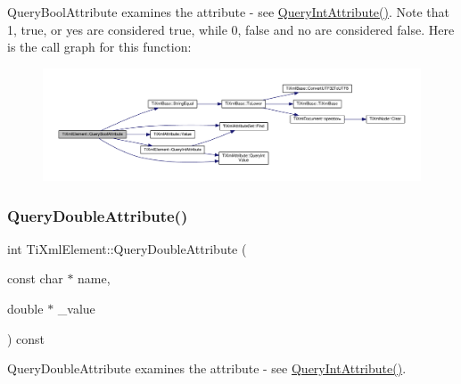 Query\+Bool\+Attribute examines the attribute -\/ see \hyperlink{class_ti_xml_element_a5c0f739e0f6f5905a201364532e54a60}{Query\+Int\+Attribute()}. Note that \textquotesingle{}1\textquotesingle{}, \textquotesingle{}true\textquotesingle{}, or \textquotesingle{}yes\textquotesingle{} are considered true, while \textquotesingle{}0\textquotesingle{}, \textquotesingle{}false\textquotesingle{} and \textquotesingle{}no\textquotesingle{} are considered false. Here is the call graph for this function\+:
\nopagebreak
\begin{figure}[H]
\begin{center}
\leavevmode
\includegraphics[width=350pt]{class_ti_xml_element_a5789b1488af75b6ae37a749700495ceb_cgraph}
\end{center}
\end{figure}
\mbox{\label{class_ti_xml_element_ae04bad29ddb281a7e6c662b3882e9928}} 
\subsubsection{\texorpdfstring{Query\+Double\+Attribute()}{QueryDoubleAttribute()}}
{\footnotesize\ttfamily int Ti\+Xml\+Element\+::\+Query\+Double\+Attribute (\begin{DoxyParamCaption}\item[{const char $\ast$}]{name,  }\item[{double $\ast$}]{\+\_\+value }\end{DoxyParamCaption}) const}



Query\+Double\+Attribute examines the attribute -\/ see \hyperlink{class_ti_xml_element_a5c0f739e0f6f5905a201364532e54a60}{Query\+Int\+Attribute()}. 

